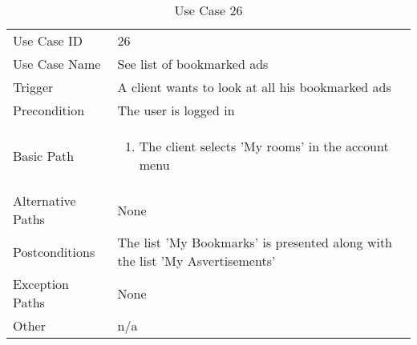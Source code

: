\begin{table}[H]
\centering
\label{table-use-case-26}
\begin{tabular}{|p{3cm}|p{10cm}}
Use Case ID       & 26                                                           
\\
Use Case Name     & See list of bookmarked ads                                                         
\\
Trigger           & A client wants to look at all his bookmarked ads                                          
\\
Precondition      & The user is logged in                                                
\\
Basic Path        & \begin{enumerate}
\item The client selects 'My rooms' in the account menu
\end{enumerate} 
     \\
Alternative Paths & None                          \\
Postconditions    & The list 'My Bookmarks' is presented along with the list 'My
Asvertisements'
\\
Exception Paths   & None                          \\
Other             & n/a                                                                                                                                                                                                        
\end{tabular}
\caption{Use Case 26}
\end{table}

